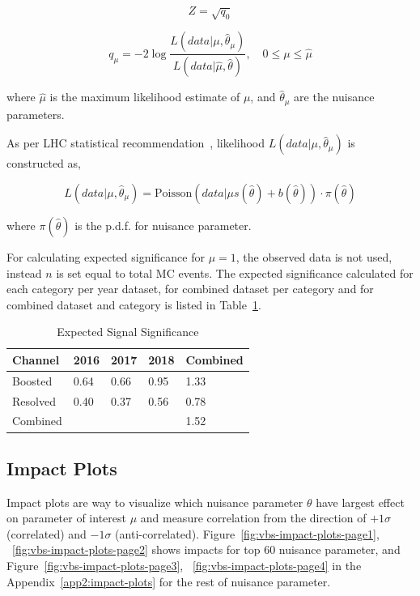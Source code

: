 \begin{equation}
  Z = \sqrt{q_0}
\end{equation}

\begin{equation}
  q_{\mu} = - 2 \log \frac{L(data | \mu,\hat{\theta}_{\mu})}{L(data | \hat{\mu},\hat{\theta})},\quad 0 \le \mu \le \hat{\mu}
\end{equation}

where \( \hat{\mu} \) is the maximum likelihood estimate of \( \mu \),
and \( \hat{\theta}_{\mu} \) are the nuisance parameters.

As per \gls{LHC} statistical recommendation~\cite{CMS-NOTE-2011-005},
likelihood \( L(data | \mu,\hat{\theta}_{\mu}) \)
is constructed as,

\begin{equation}
  L(data | \mu,\hat{\theta}_{\mu}) = \text{Poisson}(data|\mu s(\hat{\theta}) + b(\hat{\theta})) \cdot \pi(\hat{\theta})
\end{equation}

where \( \pi(\hat{\theta}) \) is the \gls{p.d.f.} for nuisance parameter.

For calculating expected significance for \( \mu = 1 \),
the observed data is not used,
instead \( n \) is set equal to total \gls{MC} events.
The expected significance calculated for
each category per year dataset, for combined dataset per
category and for combined dataset and category is listed
in Table~\ref{tab:vbs-significance}.

\begin{table}[!ht]
  \centering
  \caption{Expected Signal Significance}
  \begin{tabular}{lllll}%
    \toprule
    Channel  & 2016 & 2017 & 2018 & Combined \\
    \midrule
    Boosted  & 0.64 & 0.66 & 0.95 & 1.33     \\
    Resolved & 0.40 & 0.37 & 0.56 & 0.78     \\
    \midrule
    Combined &      &      &      & 1.52     \\
    \bottomrule
  \end{tabular}\label{tab:vbs-significance}
\end{table}

\clearpage
\subsection{
  Impact Plots
}

Impact plots are way to visualize
which nuisance parameter \( \theta \) have
largest effect on parameter of interest \( \mu \) and
measure correlation from the direction of \( +1 \sigma \) (correlated)
and \( -1 \sigma \) (anti-correlated). Figure~\ref{fig:vbs-impact-plots-page1},
~\ref{fig:vbs-impact-plots-page2} shows impacts
for top 60 nuisance parameter, and
Figure~\ref{fig:vbs-impact-plots-page3},
~\ref{fig:vbs-impact-plots-page4} in the Appendix~\ref{app2:impact-plots}
for the rest of nuisance parameter.

